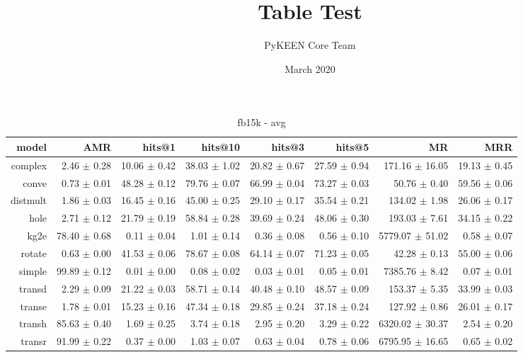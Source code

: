 \documentclass{article}
\title{Table Test}
\author{PyKEEN Core Team}
\date{March 2020}
\begin{document}
    
    \begin{table}
\centering
\caption{fb15k - avg}
\begin{tabular}{rrrrrrrr}
\toprule
    model &           AMR &        hits@1 &       hits@10 &        hits@3 &        hits@5 &               MR &           MRR \\
\midrule
  complex &   2.46 $\pm$ 0.28 &  10.06 $\pm$ 0.42 &  38.03 $\pm$ 1.02 &  20.82 $\pm$ 0.67 &  27.59 $\pm$ 0.94 &   171.16 $\pm$ 16.05 &  19.13 $\pm$ 0.45 \\
    conve &   0.73 $\pm$ 0.01 &  48.28 $\pm$ 0.12 &  79.76 $\pm$ 0.07 &  66.99 $\pm$ 0.04 &  73.27 $\pm$ 0.03 &     50.76 $\pm$ 0.40 &  59.56 $\pm$ 0.06 \\
 distmult &   1.86 $\pm$ 0.03 &  16.45 $\pm$ 0.16 &  45.00 $\pm$ 0.25 &  29.10 $\pm$ 0.17 &  35.54 $\pm$ 0.21 &    134.02 $\pm$ 1.98 &  26.06 $\pm$ 0.17 \\
     hole &   2.71 $\pm$ 0.12 &  21.79 $\pm$ 0.19 &  58.84 $\pm$ 0.28 &  39.69 $\pm$ 0.24 &  48.06 $\pm$ 0.30 &    193.03 $\pm$ 7.61 &  34.15 $\pm$ 0.22 \\
     kg2e &  78.40 $\pm$ 0.68 &   0.11 $\pm$ 0.04 &   1.01 $\pm$ 0.14 &   0.36 $\pm$ 0.08 &   0.56 $\pm$ 0.10 &  5779.07 $\pm$ 51.02 &   0.58 $\pm$ 0.07 \\
   rotate &   0.63 $\pm$ 0.00 &  41.53 $\pm$ 0.06 &  78.67 $\pm$ 0.08 &  64.14 $\pm$ 0.07 &  71.23 $\pm$ 0.05 &     42.28 $\pm$ 0.13 &  55.00 $\pm$ 0.06 \\
   simple &  99.89 $\pm$ 0.12 &   0.01 $\pm$ 0.00 &   0.08 $\pm$ 0.02 &   0.03 $\pm$ 0.01 &   0.05 $\pm$ 0.01 &   7385.76 $\pm$ 8.42 &   0.07 $\pm$ 0.01 \\
   transd &   2.29 $\pm$ 0.09 &  21.22 $\pm$ 0.03 &  58.71 $\pm$ 0.14 &  40.48 $\pm$ 0.10 &  48.57 $\pm$ 0.09 &    153.37 $\pm$ 5.35 &  33.99 $\pm$ 0.03 \\
   transe &   1.78 $\pm$ 0.01 &  15.23 $\pm$ 0.16 &  47.34 $\pm$ 0.18 &  29.85 $\pm$ 0.24 &  37.18 $\pm$ 0.24 &    127.92 $\pm$ 0.86 &  26.01 $\pm$ 0.17 \\
   transh &  85.63 $\pm$ 0.40 &   1.69 $\pm$ 0.25 &   3.74 $\pm$ 0.18 &   2.95 $\pm$ 0.20 &   3.29 $\pm$ 0.22 &  6320.02 $\pm$ 30.37 &   2.54 $\pm$ 0.20 \\
   transr &  91.99 $\pm$ 0.22 &   0.37 $\pm$ 0.00 &   1.03 $\pm$ 0.07 &   0.63 $\pm$ 0.04 &   0.78 $\pm$ 0.06 &  6795.95 $\pm$ 16.65 &   0.65 $\pm$ 0.02 \\
\bottomrule
\end{tabular}
\end{table}
\end{document}
